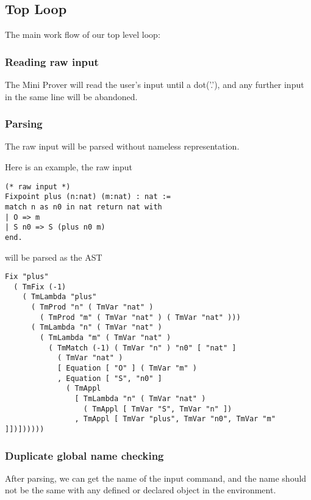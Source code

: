\subsection{Top Loop}
The main work flow of our top level loop:
\subsubsection*{Reading raw input}
The Mini Prover will read the user's input until a dot('.'), and any further input in the same line will be abandoned.
\subsubsection*{Parsing}
The raw input will be parsed without nameless representation.

Here is an example, the raw input
\begin{center}
\begin{minipage}{0.7\textwidth}
\begin{verbatim}
(* raw input *)
Fixpoint plus (n:nat) (m:nat) : nat :=
match n as n0 in nat return nat with
| O => m
| S n0 => S (plus n0 m)
end.
\end{verbatim}
\end{minipage}
\end{center}
will be parsed as the AST
\begin{center}
\begin{minipage}{0.9\textwidth}
\begin{verbatim}
Fix "plus"
  ( TmFix (-1)
    ( TmLambda "plus"
      ( TmProd "n" ( TmVar "nat" )
        ( TmProd "m" ( TmVar "nat" ) ( TmVar "nat" )))
      ( TmLambda "n" ( TmVar "nat" )
        ( TmLambda "m" ( TmVar "nat" )
          ( TmMatch (-1) ( TmVar "n" ) "n0" [ "nat" ]
            ( TmVar "nat" )
            [ Equation [ "O" ] ( TmVar "m" )
            , Equation [ "S", "n0" ]
              ( TmAppl
                [ TmLambda "n" ( TmVar "nat" )
                  ( TmAppl [ TmVar "S", TmVar "n" ])
                , TmAppl [ TmVar "plus", TmVar "n0", TmVar "m" ]])])))))
\end{verbatim}
\end{minipage}
\end{center}
\subsubsection*{Duplicate global name checking}
After parsing, we can get the name of the input command, and the name should not be the same with
any defined or declared object in the environment.
